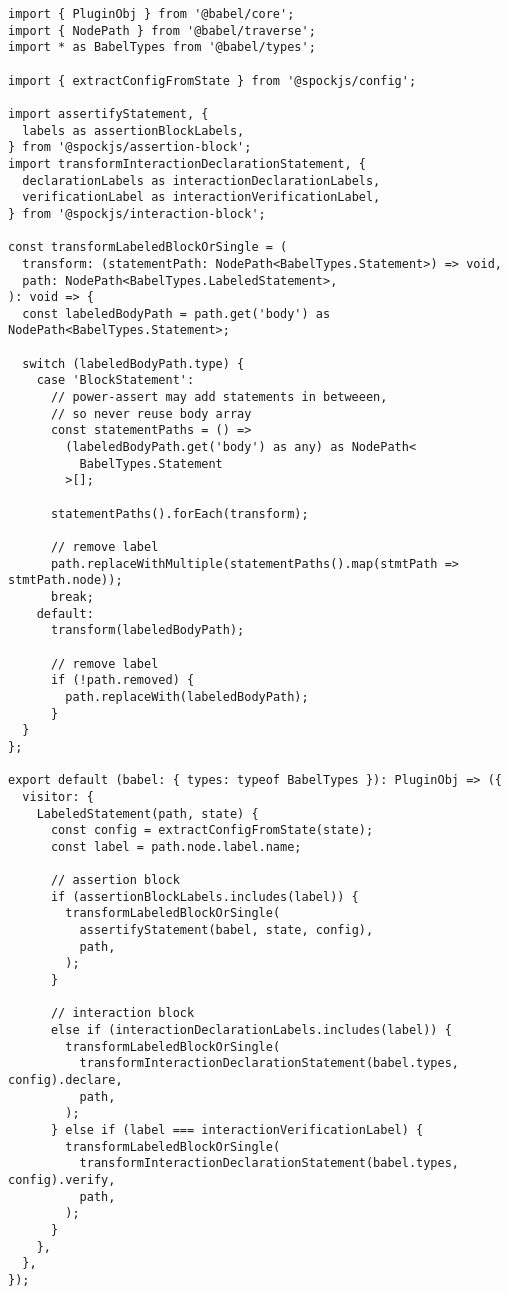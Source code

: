 \begin{verbatim}
import { PluginObj } from '@babel/core';
import { NodePath } from '@babel/traverse';
import * as BabelTypes from '@babel/types';

import { extractConfigFromState } from '@spockjs/config';

import assertifyStatement, {
  labels as assertionBlockLabels,
} from '@spockjs/assertion-block';
import transformInteractionDeclarationStatement, {
  declarationLabels as interactionDeclarationLabels,
  verificationLabel as interactionVerificationLabel,
} from '@spockjs/interaction-block';

const transformLabeledBlockOrSingle = (
  transform: (statementPath: NodePath<BabelTypes.Statement>) => void,
  path: NodePath<BabelTypes.LabeledStatement>,
): void => {
  const labeledBodyPath = path.get('body') as NodePath<BabelTypes.Statement>;

  switch (labeledBodyPath.type) {
    case 'BlockStatement':
      // power-assert may add statements in betweeen,
      // so never reuse body array
      const statementPaths = () =>
        (labeledBodyPath.get('body') as any) as NodePath<
          BabelTypes.Statement
        >[];

      statementPaths().forEach(transform);

      // remove label
      path.replaceWithMultiple(statementPaths().map(stmtPath => stmtPath.node));
      break;
    default:
      transform(labeledBodyPath);

      // remove label
      if (!path.removed) {
        path.replaceWith(labeledBodyPath);
      }
  }
};

export default (babel: { types: typeof BabelTypes }): PluginObj => ({
  visitor: {
    LabeledStatement(path, state) {
      const config = extractConfigFromState(state);
      const label = path.node.label.name;

      // assertion block
      if (assertionBlockLabels.includes(label)) {
        transformLabeledBlockOrSingle(
          assertifyStatement(babel, state, config),
          path,
        );
      }

      // interaction block
      else if (interactionDeclarationLabels.includes(label)) {
        transformLabeledBlockOrSingle(
          transformInteractionDeclarationStatement(babel.types, config).declare,
          path,
        );
      } else if (label === interactionVerificationLabel) {
        transformLabeledBlockOrSingle(
          transformInteractionDeclarationStatement(babel.types, config).verify,
          path,
        );
      }
    },
  },
});
\end{verbatim}

